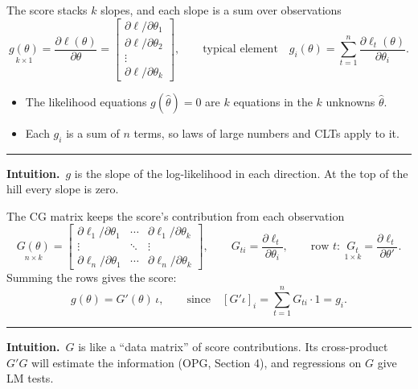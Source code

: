\documentclass[aspectratio=169,11pt,t]{beamer}
\newcommand{\hth}{\hat\theta}
\newcommand{\intuition}[1]{\par\vfill
  {\color{intu}\rule{\linewidth}{0.4pt}}\par\vspace{1pt}
  {\small\color{intu}\textbf{Intuition.}\ #1}\par\vspace{2pt}}
\begin{document}
\begin{frame}{The score stacks $k$ slopes, and each slope is a sum over observations}
\[ \underset{k\times1}{g(\theta)}=\frac{\partial\ell(\theta)}{\partial\theta}=
 \begin{bmatrix}\partial\ell/\partial\theta_{1}\\ \partial\ell/\partial\theta_{2}\\ \vdots\\ \partial\ell/\partial\theta_{k}\end{bmatrix},
 \qquad
 \text{typical element}\quad g_{i}(\theta)=\sum_{t=1}^{n}\frac{\partial\ell_{t}(\theta)}{\partial\theta_{i}} . \]
\begin{itemize}
 \item The likelihood equations $g(\hth)=0$ are $k$ equations in the $k$ unknowns $\hth$.
 \item Each $g_{i}$ is a sum of $n$ terms, so laws of large numbers and CLTs apply to it.
\end{itemize}
\intuition{$g$ is the slope of the log-likelihood in each direction. At the top of the hill every slope is zero.}
\end{frame}

\begin{frame}{The CG matrix keeps the score's contribution from each observation}
\[ \underset{n\times k}{G(\theta)}=
 \begin{bmatrix}
  \partial\ell_{1}/\partial\theta_{1} & \cdots & \partial\ell_{1}/\partial\theta_{k}\\
  \vdots & \ddots & \vdots\\
  \partial\ell_{n}/\partial\theta_{1} & \cdots & \partial\ell_{n}/\partial\theta_{k}
 \end{bmatrix},
 \qquad G_{ti}=\frac{\partial\ell_{t}}{\partial\theta_{i}},\qquad
 \text{row } t:\ \underset{1\times k}{G_{t}}=\frac{\partial\ell_{t}}{\partial\theta'} . \]
Summing the rows gives the score:
\[ g(\theta)=G'(\theta)\,\iota,
   \qquad\text{since}\quad [G'\iota]_{i}=\sum_{t=1}^{n}G_{ti}\cdot1=g_{i}. \]
\intuition{$G$ is like a ``data matrix'' of score contributions. Its cross-product $G'G$ will estimate the information (OPG, Section 4), and regressions on $G$ give LM tests.}
\end{frame}
\end{document}
